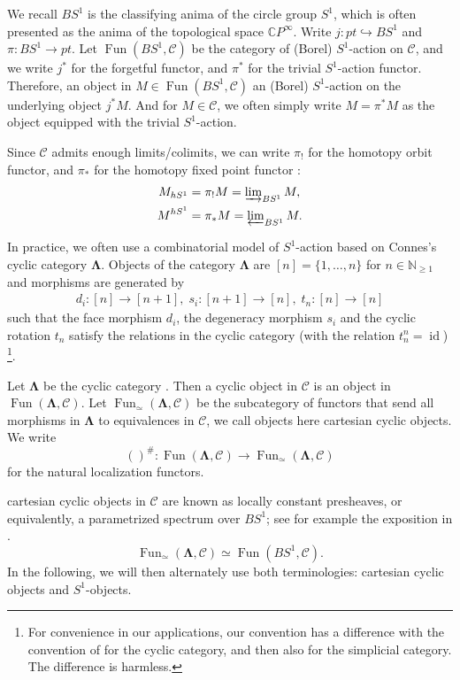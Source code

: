 \documentclass[11pt]{amsart}
\numberwithin{equation}{section}
\theoremstyle{plain}
\theoremstyle{definition}
\theoremstyle{remark}
\newcommand{\bC} { {\mathbb{C}}}
\newcommand{\bN} { {\mathbb{N}}}
\newcommand{\cC} { {\mathcal{C}}}
\newcommand{\id}{{\operatorname{id}}}
\newcommand\Fun{\operatorname{Fun}}
\newcommand{\bLambda}{{\boldsymbol{\Lambda}}}
\begin{document}
We recall $BS^1$ is the classifying anima of the circle group $S^1$, which is often presented as the anima of the topological space $\bC P^\infty$. Write $j: pt \hookrightarrow BS^1$ and $\pi: BS^1 \to pt$. Let  $ \Fun(BS^1,\cC)$ be the category of (Borel) $S^1$-action on $\cC$, and we write $j^*$ for the forgetful functor, and $\pi^*$ for the trivial $S^1$-action functor. Therefore, an object in $M\in \Fun(BS^1,\cC)$ an (Borel) $S^1$-action on the underlying object $j^*M$. And for $M\in \cC$, we often simply write $M=\pi^*M$ as the object equipped with the trivial $S^1$-action. 

Since $\cC$ admits enough limits/colimits, we can write $\pi_!$ for the homotopy orbit functor, and $\pi_*$ for the homotopy fixed point functor \cite[Example 6.1.6.2]{HA}:
\begin{align*}
    M_{hS^1} &= \pi_!M =  \varinjlim\nolimits_{BS^1}M, \\
    M^{hS^1} &= \pi_*M =  \varprojlim\nolimits_{BS^1}M.
\end{align*}

In practice, we often use a combinatorial model of $S^1$-action based on Connes's cyclic category $\bLambda$. Objects of the category $\boldsymbol{\Lambda}$ are $[n]=\{1,\dots,n\} $ for $n\in \bN_{\geq 1}$  and morphisms are generated by
\begin{align*}
    d_i: [n] \to [n+1], \;s_i: [n+1] \to [n], \;t_{n}: [n] \to [n]
\end{align*}
such that the face morphism $d_i$, the degeneracy morphism $s_i$ and the cyclic rotation $t_n$ satisfy the relations in the cyclic category (with the relation $t_n^{n} = \id$) \cite[Definition 6.1.1]{LodayCyclic}\footnote{For convenience in our applications, our convention has a difference with the convention of \cite[Definition 6.1.1]{LodayCyclic} for the cyclic category, and then also for the simplicial category. The difference is harmless.}.

Let $\boldsymbol{\Lambda}$ be the cyclic category \cite{Connes1983}. Then a cyclic object in $\cC$ is an object in $\Fun(\boldsymbol{\Lambda}, \cC)$. Let $\Fun_\simeq (\boldsymbol{\Lambda}, \cC)$ be the subcategory of functors that send all morphisms in $\boldsymbol{\Lambda}$ to equivalences in $\cC$, we call objects here cartesian cyclic objects. 
We write 
\[()^\#: \Fun (\boldsymbol{\Lambda}, \cC) \to \Fun_\simeq (\boldsymbol{\Lambda}, \cC)\]
for the natural localization functors.

cartesian cyclic objects in $\cC$ are known as locally constant presheaves, or equivalently, a parametrized spectrum over $BS^1$; see for example the exposition in \cite[Section 2]{Li-Zhang26-1}.
\[\Fun_\simeq (\boldsymbol{\Lambda}, \cC)\simeq \Fun(BS^1,\cC).\] 
In the following, we will then alternately use both terminologies: cartesian cyclic objects and $S^1$-objects.
\end{document}
